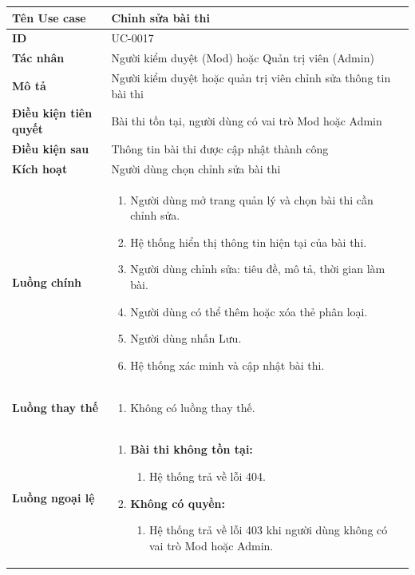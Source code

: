 {
\renewcommand{\arraystretch}{1.5}

\begin{tabularx}{\textwidth}{|>{\raggedright\arraybackslash}X|>{\raggedright\arraybackslash}X|}
\hline
\textbf{Tên Use case} & Chỉnh sửa bài thi \\
\hline
\textbf{ID} & UC-0017 \\
\hline
\textbf{Tác nhân} & Người kiểm duyệt (Mod) hoặc Quản trị viên (Admin) \\
\hline
\textbf{Mô tả} & Người kiểm duyệt hoặc quản trị viên chỉnh sửa thông tin bài thi \\
\hline
\textbf{Điều kiện tiên quyết} & Bài thi tồn tại, người dùng có vai trò Mod hoặc Admin \\
\hline
\textbf{Điều kiện sau} & Thông tin bài thi được cập nhật thành công \\
\hline
\textbf{Kích hoạt} & Người dùng chọn chỉnh sửa bài thi \\
\hline
\textbf{Luồng chính} &
\begin{enumerate}
    \item Người dùng mở trang quản lý và chọn bài thi cần chỉnh sửa.
    \item Hệ thống hiển thị thông tin hiện tại của bài thi.
    \item Người dùng chỉnh sửa: tiêu đề, mô tả, thời gian làm bài.
    \item Người dùng có thể thêm hoặc xóa thẻ phân loại.
    \item Người dùng nhấn Lưu.
    \item Hệ thống xác minh và cập nhật bài thi.
\end{enumerate} \\
\hline
\textbf{Luồng thay thế} &
\begin{enumerate}
    \item Không có luồng thay thế.
\end{enumerate} \\
\hline
\textbf{Luồng ngoại lệ} &
\begin{enumerate}
    \item \textbf{Bài thi không tồn tại:}
    \begin{enumerate}
        \item[1Err.] Hệ thống trả về lỗi 404.
    \end{enumerate}
    \item \textbf{Không có quyền:}
    \begin{enumerate}
        \item[1Err2.] Hệ thống trả về lỗi 403 khi người dùng không có vai trò Mod hoặc Admin.
    \end{enumerate}
\end{enumerate} \\
\hline
\end{tabularx}
}
